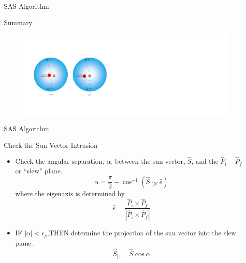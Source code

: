 \documentclass{beamer}
\begin{document}
\begin{frame}{SAS Algorithm}
\begin{block}{Summary}
	\begin{figure}
		\includegraphics[width=4.85in]{./Figures/SASSchematic3}
	\end{figure}
\end{block}
\end{frame}
%
\begin{frame}{SAS Algorithm}
\begin{block}{Check the Sun Vector Intrusion}
\begin{itemize}
\item Check the angular separation, $\alpha$, between the sun vector, $\hat{S}$, and the $\hat{P}_i-\hat{P}_f$ or ``slew'' plane.
\begin{equation}
\alpha=\frac{\pi}{2}-\cos^{-1}(\hat{S}\cdot_\mathcal{N}\hat{e})
\end{equation}
where the eigenaxis is determined by
\begin{equation}\label{eaxis}
\hat{e}=\frac{\hat{P}_i\times\hat{P}_f}{|\hat{P}_i\times \hat{P}_f|}
\end{equation} 

\item IF $|\alpha|<\epsilon_p$,THEN determine the projection of the sun vector into the slew plane.
\begin{equation}\label{Sbar}
\vec{S}_{||}=\hat{S}\cos\alpha
\end{equation}

\end{itemize}
\end{block}
\end{frame}
\end{document}

